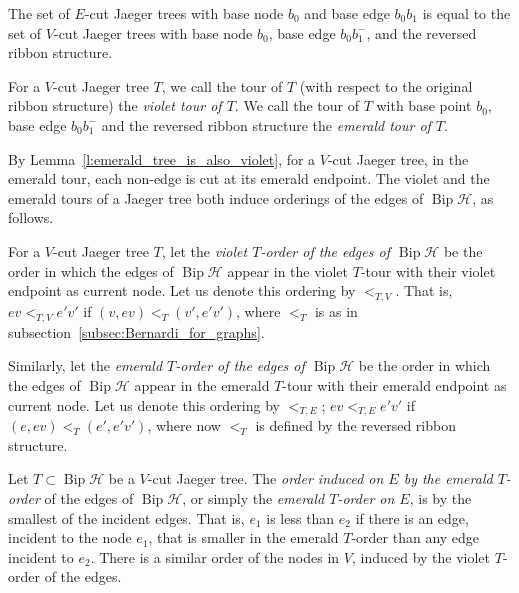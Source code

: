 \documentclass[ALCO,ThmDefs,Unicode,epreuves]{cedram}
\newcommand{\HH}{\mathcal H}
\DeclareMathOperator{\bip}{Bip}
\begin{document}
\begin{lemma}\label{c:set_of_emerald_trees_eq_violet}
The set of $E$-cut Jaeger trees with base node $b_0$ and base edge $b_0b_1$ is equal to the set of $V$-cut Jaeger trees with base node $b_0$, base edge $b_0b_1^-$, and the reversed ribbon structure.
\end{lemma}

\begin{defi}
For a $V$-cut Jaeger tree $T$, we call the tour of $T$ (with respect to the original ribbon structure) the \emph{violet tour of $T$}. We call the tour of $T$ with base point $b_0$, base edge $b_0b_1^-$ and the reversed ribbon structure the \emph{emerald tour of $T$}.
\end{defi}

By Lemma~\ref{l:emerald_tree_is_also_violet}, for a $V$-cut Jaeger tree, in the emerald tour, each non-edge is cut at its emerald endpoint. The violet and the emerald tours of a Jaeger tree both induce orderings of the edges of $\bip \HH$, as follows. 

\begin{defi}\label{def:T-order}
For a $V$-cut Jaeger tree $T$, let the \emph{violet $T$-order of the edges of $\bip \HH$} be the order in which the edges of $\bip \HH$ appear in the violet $T$-tour with their violet endpoint as current node. Let us denote this ordering by $<_{T,V}$. That is, $ev <_{T,V} e'v'$ if $(v,ev)<_T (v', e'v')$, where $<_T$ is as in subsection~\ref{subsec:Bernardi_for_graphs}.

Similarly, let the \emph{emerald $T$-order of the edges of $\bip \HH$} be the order in which the edges of $\bip \HH$ appear in the emerald $T$-tour with their emerald endpoint as current node. Let us denote this ordering by $<_{T,E}$; \ie $ev <_{T,E} e'v'$ if $(e,ev)<_T (e', e'v')$, where now $<_T$ is defined by the reversed ribbon structure.
\end{defi}

\begin{defi}\label{def:induced_order}
Let $T\subset\bip\HH$ be a $V$-cut Jaeger tree. The \emph{order induced on $E$ by the emerald $T$-order} of the edges of $\bip \HH$, or simply the \emph{emerald $T$-order on $E$}, is by the smallest of the incident edges. That is, $e_1$ is less than $e_2$ if there is an edge, incident to the node $e_1$, that is smaller in the emerald $T$-order than any edge incident to $e_2$. There is a similar order of the nodes in $V$, induced by the violet $T$-order of the edges.
\end{defi}
\end{document}
